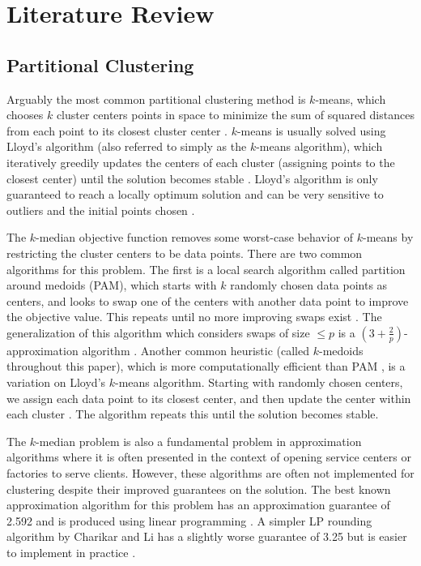 \documentclass[conference, 10pt, final]{IEEEtran}
\begin{document}
\section{Literature Review}

\subsection{Partitional Clustering}
Arguably the most common partitional clustering method is $k$-means, which chooses $k$ cluster centers points in space to minimize the sum of squared distances from each point to its closest cluster center \cite{Jain}.  $k$-means is usually solved using Lloyd's algorithm (also referred to simply as the $k$-means algorithm), which iteratively greedily updates the centers of each cluster (assigning points to the closest center) until the solution becomes stable \cite{Jain}. Lloyd's algorithm is only guaranteed to reach a locally optimum solution and can be very sensitive to outliers and the initial points chosen \cite{Kanungo}.

The $k$-median objective function removes some worst-case behavior of $k$-means by restricting the cluster centers to be data points.  There are two common algorithms for this problem. The first is a local search algorithm called partition around medoids (PAM), which starts with $k$ randomly chosen data points as centers, and looks to swap one of the centers with another data point to improve the objective value. This repeats until no more improving swaps exist \cite{ESL}. The generalization of this algorithm which considers swaps of size $\leq p$ is a $(3 + \frac{2}{p})$-approximation algorithm \cite{Arya}.
Another common heuristic (called $k$-medoids throughout this paper), which is more computationally efficient than PAM \cite{Park}, is a variation on Lloyd's $k$-means algorithm.  Starting with randomly chosen centers, we assign each data point to its closest center, and then update the center within each cluster \cite{Park}. The algorithm repeats this until the solution becomes stable.

The $k$-median problem is also a fundamental problem in approximation algorithms where it is often presented in the context of opening service centers or factories to serve clients. However, these algorithms are often not implemented for clustering despite their improved guarantees on the solution. The best known approximation algorithm for this problem has an approximation guarantee of 2.592 and is produced using linear programming \cite{Wu}. A simpler LP rounding algorithm by Charikar and Li has a slightly worse guarantee of 3.25 but is easier to implement in practice \cite{Charikar}. 
\end{document}
